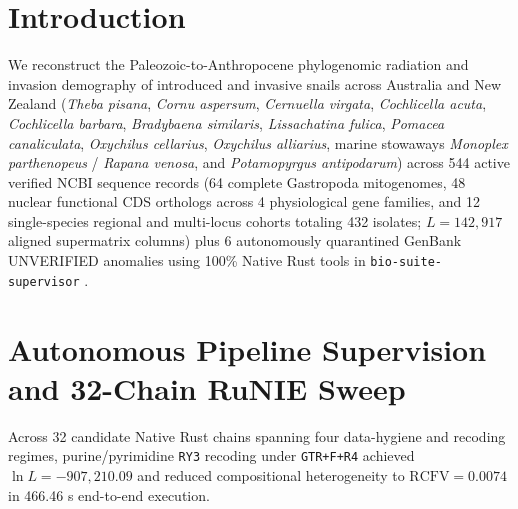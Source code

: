 \documentclass[10pt,letterpaper]{article}
\begin{document}
\section{Introduction}
We reconstruct the Paleozoic-to-Anthropocene phylogenomic radiation and invasion demography of introduced and invasive snails across Australia and New Zealand (\textit{Theba pisana}, \textit{Cornu aspersum}, \textit{Cernuella virgata}, \textit{Cochlicella acuta}, \textit{Cochlicella barbara}, \textit{Bradybaena similaris}, \textit{Lissachatina fulica}, \textit{Pomacea canaliculata}, \textit{Oxychilus cellarius}, \textit{Oxychilus alliarius}, marine stowaways \textit{Monoplex parthenopeus} / \textit{Rapana venosa}, and \textit{Potamopyrgus antipodarum}) across 544 active verified NCBI sequence records (64 complete Gastropoda mitogenomes, 48 nuclear functional CDS orthologs across 4 physiological gene families, and 12 single-species regional and multi-locus cohorts totaling 432 isolates; $L = 142,917$ aligned supermatrix columns) plus 6 autonomously quarantined GenBank UNVERIFIED anomalies using 100\% Native Rust tools in \texttt{bio-suite-supervisor} \cite{ref1,ref6,ref7}.
\section{Autonomous Pipeline Supervision and 32-Chain RuNIE Sweep}
Across 32 candidate Native Rust chains spanning four data-hygiene and recoding regimes, purine/pyrimidine \texttt{RY3} recoding under \texttt{GTR+F+R4} achieved $\ln L = -907,210.09$ and reduced compositional heterogeneity to $\mathrm{RCFV} = 0.0074$ in 466.46 s end-to-end execution.
\end{document}
